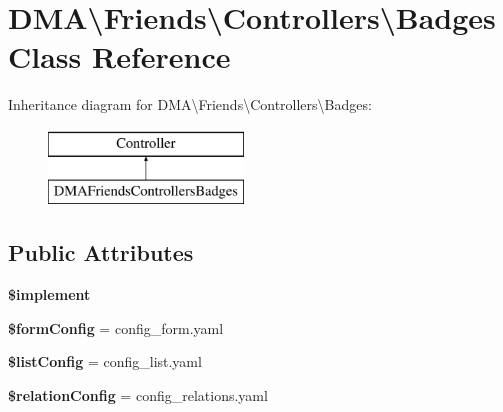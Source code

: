 \hypertarget{classDMA_1_1Friends_1_1Controllers_1_1Badges}{}\section{D\+M\+A\textbackslash{}Friends\textbackslash{}Controllers\textbackslash{}Badges Class Reference}
\label{classDMA_1_1Friends_1_1Controllers_1_1Badges}
Inheritance diagram for D\+M\+A\textbackslash{}Friends\textbackslash{}Controllers\textbackslash{}Badges\+:\begin{figure}[H]
\begin{center}
\leavevmode
\includegraphics[height=2.000000cm]{d2/d27/classDMA_1_1Friends_1_1Controllers_1_1Badges}
\end{center}
\end{figure}
\subsection*{Public Attributes}
\begin{DoxyCompactItemize}
\item 
{\bfseries \$implement}
\item 
\hypertarget{classDMA_1_1Friends_1_1Controllers_1_1Badges_acc1326493cec81e89163a9f917990fc5}{}{\bfseries \$form\+Config} = \textquotesingle{}config\+\_\+form.\+yaml\textquotesingle{}\label{classDMA_1_1Friends_1_1Controllers_1_1Badges_acc1326493cec81e89163a9f917990fc5}

\item 
\hypertarget{classDMA_1_1Friends_1_1Controllers_1_1Badges_a334b46e1ea9b57d53e297c4a5f93e045}{}{\bfseries \$list\+Config} = \textquotesingle{}config\+\_\+list.\+yaml\textquotesingle{}\label{classDMA_1_1Friends_1_1Controllers_1_1Badges_a334b46e1ea9b57d53e297c4a5f93e045}

\item 
\hypertarget{classDMA_1_1Friends_1_1Controllers_1_1Badges_a70621d9f81b7f23a330e7f08dbdb7ce9}{}{\bfseries \$relation\+Config} = \textquotesingle{}config\+\_\+relations.\+yaml\textquotesingle{}\label{classDMA_1_1Friends_1_1Controllers_1_1Badges_a70621d9f81b7f23a330e7f08dbdb7ce9}

\end{DoxyCompactItemize}


